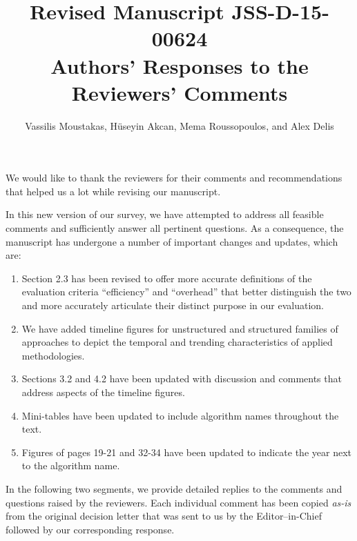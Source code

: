 \documentclass[10pt,letterpaper]{article}
\begin{document}
\title{
	\textbf{\textsf{
	Revised Manuscript JSS-D-15-00624\\
	Authors' Responses to the Reviewers' Comments
	}}
}
\author{Vassilis Moustakas, H\"useyin Akcan, Mema Roussopoulos, and Alex Delis}
\maketitle

\section*{}
We would like to thank the reviewers for their comments and recommendations 
that helped us a lot while revising our manuscript.

In this new version of our survey, 
we have attempted to address all feasible comments 
and sufficiently answer all pertinent questions.
As a consequence, the 
manuscript has undergone a number 
of important changes and updates, which are:

\begin{enumerate}
    
\item 
Section 2.3 has been revised to offer more accurate definitions 
of the evaluation criteria ``efficiency'' and ``overhead'' that 
better distinguish the two and more accurately articulate
their distinct purpose in our evaluation.
\item 
We have added timeline figures for unstructured and structured families 
of approaches to depict
the temporal and trending characteristics of applied methodologies.
\item 
Sections 3.2 and 4.2 have been updated with discussion and comments 
that address aspects of the timeline figures.
\item 
Mini-tables have been updated to include 
algorithm names throughout the text. 
\item 
Figures of pages 19-21 and 32-34 have been updated to indicate 
the year next to the algorithm name.

\end{enumerate}

In the following two segments, we provide detailed replies to 
the comments and questions raised by the reviewers. 
Each individual comment has been copied \emph{as-is} from 
the original decision letter that was sent to us by 
the Editor--in-Chief followed by our corresponding response. 

\clearpage
\end{document}
